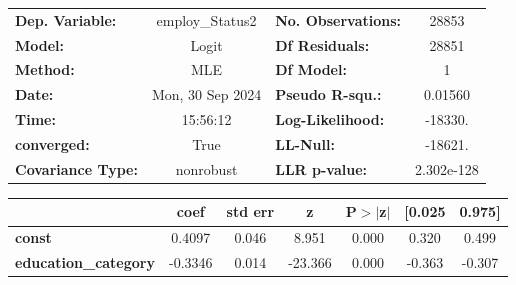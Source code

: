 \begin{center}
\begin{tabular}{lclc}
\toprule
\textbf{Dep. Variable:}      & employ\_Status2  & \textbf{  No. Observations:  } &    28853    \\
\textbf{Model:}              &      Logit       & \textbf{  Df Residuals:      } &    28851    \\
\textbf{Method:}             &       MLE        & \textbf{  Df Model:          } &        1    \\
\textbf{Date:}               & Mon, 30 Sep 2024 & \textbf{  Pseudo R-squ.:     } &  0.01560    \\
\textbf{Time:}               &     15:56:12     & \textbf{  Log-Likelihood:    } &   -18330.   \\
\textbf{converged:}          &       True       & \textbf{  LL-Null:           } &   -18621.   \\
\textbf{Covariance Type:}    &    nonrobust     & \textbf{  LLR p-value:       } & 2.302e-128  \\
\bottomrule
\end{tabular}
\begin{tabular}{lcccccc}
                             & \textbf{coef} & \textbf{std err} & \textbf{z} & \textbf{P$> |$z$|$} & \textbf{[0.025} & \textbf{0.975]}  \\
\midrule
\textbf{const}               &       0.4097  &        0.046     &     8.951  &         0.000        &        0.320    &        0.499     \\
\textbf{education\_category} &      -0.3346  &        0.014     &   -23.366  &         0.000        &       -0.363    &       -0.307     \\
\bottomrule
\end{tabular}
\end{center}